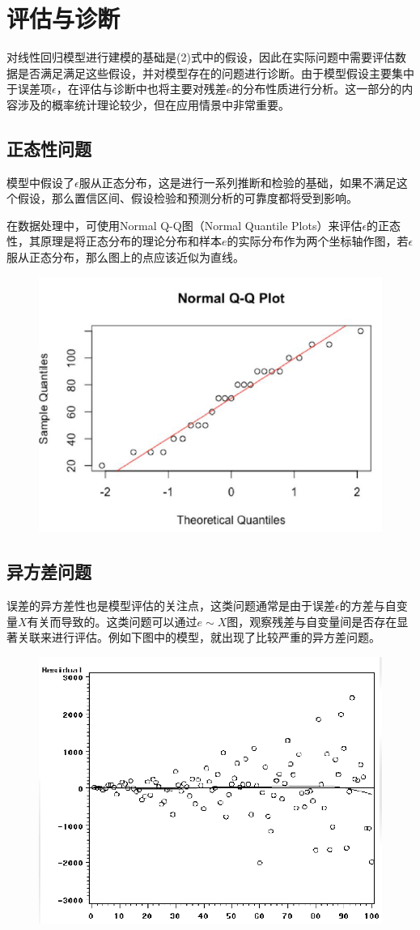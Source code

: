 \documentclass[UTF8]{ctexart}
\begin{document}
\section{评估与诊断}
对线性回归模型进行建模的基础是(2)式中的假设，因此在实际问题中需要评估数据是否满足满足这些假设，并对模型存在的问题进行诊断。由于模型假设主要集中于误差项$\epsilon$，在评估与诊断中也将主要对残差$e$的分布性质进行分析。这一部分的内容涉及的概率统计理论较少，但在应用情景中非常重要。

\subsection{正态性问题}
模型中假设了$\epsilon$服从正态分布，这是进行一系列推断和检验的基础，如果不满足这个假设，那么置信区间、假设检验和预测分析的可靠度都将受到影响。

在数据处理中，可使用Normal Q-Q图（Normal Quantile Plots）来评估$\epsilon$的正态性，其原理是将正态分布的理论分布和样本$e$的实际分布作为两个坐标轴作图，若$\epsilon$服从正态分布，那么图上的点应该近似为直线。

\begin{figure}[htbp]
	\centering
	\includegraphics[width=0.7\linewidth]{plot1.png}
\end{figure} 

\subsection{异方差问题}
误差的异方差性也是模型评估的关注点，这类问题通常是由于误差$\epsilon$的方差与自变量$X$有关而导致的。这类问题可以通过$e\sim X$图，观察残差与自变量间是否存在显著关联来进行评估。例如下图中的模型，就出现了比较严重的异方差问题。

\begin{figure}[htbp]
	\centering
	\includegraphics[width=0.7\linewidth]{plot2.png}
\end{figure} 
\end{document}
